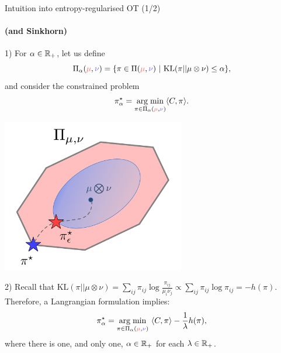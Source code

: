 \documentclass[pdf,aspectratio=169,10pt]{beamer}
\begin{document}
\begin{frame}{Intuition into entropy-regularised OT (1/2)}
\framesubtitle{(and Sinkhorn)}


    \begin{minipage}{0.49\textwidth}
        1) For $\alpha\in{\mathbb{R}}_+$, let us define $$\Pi_\alpha(\er{\mu},\eb{\nu}) = \{\pi\in \Pi(\er{\mu},\eb{\nu}) ~|~ \text{KL}(\pi||\mu\otimes\nu)\leq \alpha\},$$ and consider the constrained problem $$\pi^\star_\alpha = \argmin_{\pi\in \Pi_\alpha(\er{\mu},\eb{\nu})} \langle C,\pi\rangle.$$  
    \end{minipage}
    \hfill
    \begin{minipage}{0.49\textwidth}
        \centering
        \includegraphics[width=0.6\textwidth]{../img/polytope2.pdf}
    \end{minipage}

2) Recall that $\text{KL}(\pi||\mu\otimes\nu) = \sum_{ij} \pi_{ij} \log\frac{\pi_{ij}}{\mu_i\nu_j} \propto \sum_{ij} \pi_{ij} \log\pi_{ij} = -h(\pi)$. Therefore, a Langrangian formulation implies:
$$\pi^\star_\alpha = \argmin_{\pi\in \Pi_\alpha(\er{\mu},\eb{\nu})} \ \langle C,\pi\rangle - \frac{1}{\lambda} h(\pi),$$
where there is one, and only one, $\alpha\in{\mathbb{R}}_+$ for each $\lambda\in{\mathbb{R}}_+$.


\end{frame}
\end{document}
